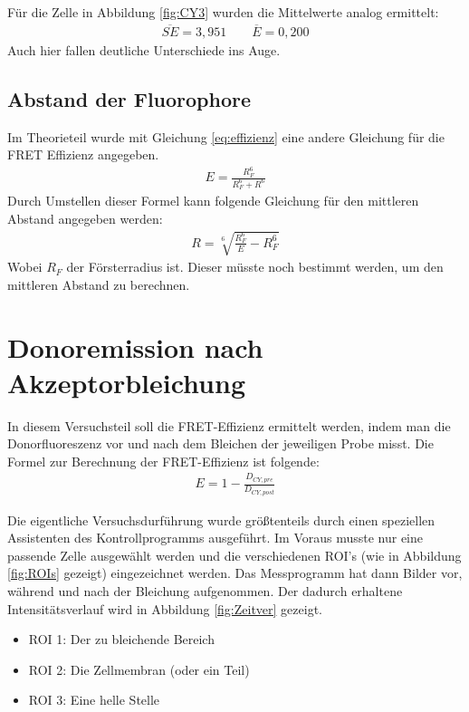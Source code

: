 Für die Zelle in Abbildung \ref{fig:CY3} wurden die Mittelwerte analog ermittelt: 
\begin{align*}
    \overline{SE} = 3,951 \qquad \overline{E} = 0,200
\end{align*}
Auch hier fallen deutliche Unterschiede ins Auge.

\subsection{Abstand der Fluorophore}
Im Theorieteil wurde mit Gleichung \ref{eq:effizienz} eine andere Gleichung für die FRET Effizienz angegeben. 
\begin{align}
    E = \frac{R_F^6}{R_F^6+R^6}
\end{align}
Durch Umstellen dieser Formel kann folgende Gleichung für den mittleren Abstand angegeben werden: 
\begin{align}
    R = \sqrt[6]{\frac{R_F^6}{E} - R_F^6} 
\end{align}
Wobei $R_F$ der Försterradius ist. Dieser müsste noch bestimmt werden, um den mittleren Abstand zu berechnen.

\newpage
\section{Donoremission nach Akzeptorbleichung}
In diesem Versuchsteil soll die FRET-Effizienz ermittelt werden, indem man die Donorfluoreszenz vor und nach dem Bleichen der jeweiligen Probe misst. Die Formel zur Berechnung der FRET-Effizienz ist folgende: 
\begin{align}
    E = 1 - \frac{D_{CY,pre}}{D_{CY,post}}
    \label{eq:FREE}
\end{align}

Die eigentliche Versuchsdurführung wurde größtenteils durch einen speziellen Assistenten des Kontrollprogramms ausgeführt. Im Voraus musste nur eine passende Zelle ausgewählt werden und die verschiedenen ROI's (wie in Abbildung \ref{fig:ROIs} gezeigt) eingezeichnet werden. Das Messprogramm hat dann Bilder vor, während und nach der Bleichung aufgenommen. Der dadurch erhaltene Intensitätsverlauf wird in Abbildung \ref{fig:Zeitver} gezeigt.
\begin{itemize}
    \item ROI 1: Der zu bleichende Bereich
    \item ROI 2: Die Zellmembran (oder ein Teil)
    \item ROI 3: Eine helle Stelle
\end{itemize}

